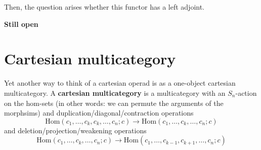 \documentclass{amsbook}
\begin{document}
  Then, the question arises whether this functor has a left adjoint.

  \textbf{Still open}

  \section{Cartesian multicategory}
  Yet another way to think of a cartesian operad is as a one-object cartesian multicategory. A \textbf{cartesian multicategory} is a multicategory with an $ S_n $-action on the hom-sets (in other words: we can permute the arguments of the morphsims) and duplication/diagonal/contraction operations
  \[ \mathrm{Hom}(c_1, \dots, c_k, c_k, \dots, c_n; c) \to \mathrm{Hom}(c_1, \dots, c_k, \dots, c_n; c) \]
  and deletion/projection/weakening operations
  \[ \mathrm{Hom}(c_1, \dots, c_k, \dots, c_n; c) \to \mathrm{Hom}(c_1, \dots, c_{k-1}, c_{k+1}, \dots, c_n; c) \]
\end{document}
